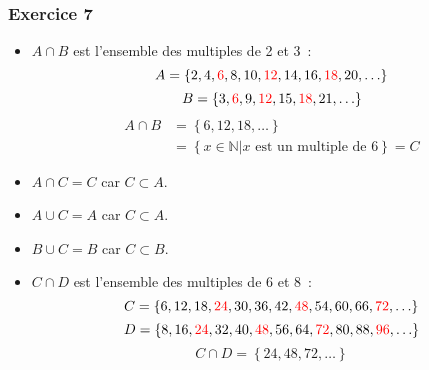 \documentclass[10pt,notheorems]{beamer}
\newcommand{\red}{\color{red}}
\theoremstyle{plain}
\theoremstyle{definition} %
\begin{document}
\begin{frame}
  \frametitle{Exercice 7}
  \fontsize{8}{10}\selectfont

  \begin{itemize}

  \item $A\cap B$ est l'ensemble des multiples de 2 et 3~:
    \[
      A = \left\{2, 4, {\red 6}, 8, 10, {\red 12}, 14, 16, {\red 18}, 20, \ldots\right\}
    \]
    \[
      B = \left\{3, {\red 6}, 9, {\red 12}, 15, {\red 18}, 21, \ldots\right\}
    \]
    \[
      \begin{split}
        A\cap B &= \left\{6, 12, 18, \ldots\right\}\\
        &= \left\{x\in\mathbb N | x\text{ est un multiple de 6}\right\} = C
      \end{split}
    \]

  \item $A \cap C = C$ car $C \subset A$.\newline

  \item $A \cup C = A$ car $C \subset A$.\newline

  \item $B \cup C = B$ car $C \subset B$.\newline

  \item $C \cap D$  est l'ensemble des multiples de 6 et 8 :
    \[
      C = \left\{6, 12, 18, {\red 24}, 30, 36, 42, {\red 48}, 54, 60, 66, {\red 72}, \ldots\right\}
    \]
    \[
      D = \left\{8, 16, {\red 24}, 32, 40, {\red 48}, 56, 64, {\red 72}, 80, 88, {\red 96}, \ldots\right\}
    \]
    \[
      C\cap D = \left\{24, 48, 72, \ldots\right\}
    \]

  \end{itemize}

\end{frame}
\end{document}
